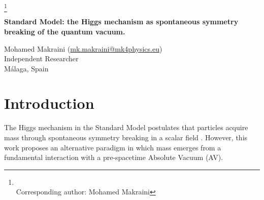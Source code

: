 \documentclass[twoside]{article}
\theoremstyle{definition}
\theoremstyle{remark}
\numberwithin{equation}{section}
\theoremstyle{definition}
\theoremstyle{example}
\theoremstyle{remark}
\numberwithin{equation}{section}%
\begin{document}
		\label{begin-art}
		\pagestyle{headings}
		\thispagestyle{plain} 
		\footnote{\hspace{-18.1pt}\\ Corresponding author: Mohamed Makraini}
		\begin{center}
			{\LARGE\bfseries Standard Model: the Higgs mechanism as spontaneous symmetry breaking of the quantum vacuum. \par }
			
			\vspace{3mm}

			{\large Mohamed Makraini (\url{mk.makraini@mk4physics.eu})}\\
			Independent Researcher\\
			Málaga, Spain
			
		\end{center}
		

		
		
		\begin{abstract}

	We present a simulation of the coupling between the Higgs field (\( \Phi \)), the density of the Absolute Vacuum/Space-Time (\( \varrho \)), and an emergent curvature interpreted as gravitational. The model allows variation of key physical parameters.
	
	We argue that the Higgs field does not acquire mass via spontaneous symmetry breaking in the quantum vacuum~\cite{higgs1964}, but rather through direct interaction with the Absolute Vacuum, which lacks space-time structure. The resulting spacetime curvature emerges from AV flux effects, without invoking graviton exchange~\cite{rovelli2018}.



			
			\textbf{Keywords:} Absolute Vacuum, Higgs field, quantum density, emergent gravity, symmetry breaking.
		\end{abstract}
		
		
		
	\section{Introduction}
	
	The Higgs mechanism in the Standard Model postulates that particles acquire mass through spontaneous symmetry breaking in a scalar field \cite{higgs1964}. However, this work proposes an alternative paradigm in which mass emerges from a fundamental interaction with a pre-spacetime Absolute Vacuum (AV).\\
	
\end{document}
